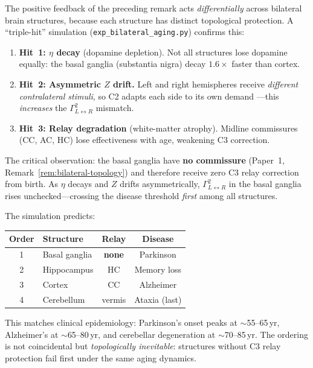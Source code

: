 \documentclass[aps,pre,twocolumn,superscriptaddress,floatfix]{revtex4-2}
\begin{document}
\begin{remark}
\label{rem:bilateral-aging-order}
The positive feedback of the preceding remark acts
\emph{differentially} across bilateral brain
structures, because each structure has distinct
topological protection.
A ``triple-hit'' simulation
(\texttt{exp\_bilateral\_aging.py}) confirms this:
\begin{enumerate}
  \item \textbf{Hit~1: $\eta$ decay} (dopamine
    depletion).
    Not all structures lose dopamine equally:
    the basal ganglia (substantia nigra) decay
    $1.6\times$ faster than cortex.
  \item \textbf{Hit~2: Asymmetric $Z$ drift.}
    Left and right hemispheres receive
    \emph{different contralateral stimuli},
    so C2 adapts each side to its own demand
    ---this \emph{increases} the
    $\Gamma^2_{L \leftrightarrow R}$ mismatch.
  \item \textbf{Hit~3: Relay degradation}
    (white-matter atrophy).
    Midline commissures (CC, AC, HC) lose
    effectiveness with age, weakening C3 correction.
\end{enumerate}
The critical observation: the basal ganglia
have \textbf{no commissure}
(Paper~1, Remark~\ref*{rem:bilateral-topology})
and therefore receive zero C3 relay correction
from birth.
As $\eta$ decays and $Z$ drifts asymmetrically,
$\Gamma^2_{L \leftrightarrow R}$ in the basal
ganglia rises unchecked---crossing the disease
threshold \emph{first} among all structures.

The simulation predicts:
\begin{center}
\renewcommand{\arraystretch}{1.15}
\begin{tabular}{@{}clcc@{}}
\toprule
Order & Structure & Relay & Disease \\
\midrule
1 & Basal ganglia & \textbf{none} & Parkinson \\
2 & Hippocampus & HC & Memory loss \\
3 & Cortex & CC & Alzheimer \\
4 & Cerebellum & vermis & Ataxia (last) \\
\bottomrule
\end{tabular}
\end{center}
This matches clinical epidemiology:
Parkinson's onset peaks at $\sim$55--65\,yr,
Alzheimer's at $\sim$65--80\,yr,
and cerebellar degeneration at $\sim$70--85\,yr.
The ordering is not coincidental but
\emph{topologically inevitable}:
structures without C3 relay protection
fail first under the same aging dynamics.
\end{remark}
\end{document}
